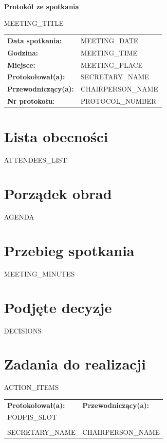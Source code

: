 \documentclass[a4paper,11pt]{article}
\begin{document}
\begin{center}
{\Large\bfseries Protokół ze spotkania}

\vskip 0.3cm
{\large {{MEETING_TITLE}}}
\end{center}

\vskip 0.5cm

\noindent
\begin{tabular}{@{}ll}
\textbf{Data spotkania:} & {{MEETING_DATE}} \\
\textbf{Godzina:} & {{MEETING_TIME}} \\
\textbf{Miejsce:} & {{MEETING_PLACE}} \\
\textbf{Protokołował(a):} & {{SECRETARY_NAME}} \\
\textbf{Przewodniczący(a):} & {{CHAIRPERSON_NAME}} \\
\textbf{Nr protokołu:} & {{PROTOCOL_NUMBER}} \\
\end{tabular}

\vskip 0.8cm

\section*{Lista obecności}
{{ATTENDEES_LIST}}

\section*{Porządek obrad}
{{AGENDA}}

\section*{Przebieg spotkania}
{{MEETING_MINUTES}}

\section*{Podjęte decyzje}
{{DECISIONS}}

\section*{Zadania do realizacji}
{{ACTION_ITEMS}}

\vskip 1.5cm

\noindent
\begin{tabular}{p{7cm}p{7cm}}
\textbf{Protokołował(a):} & \textbf{Przewodniczący(a):} \\
{{PODPIS_SLOT}} & \\[-3mm]
\dotfill & \dotfill \\
{{SECRETARY_NAME}} & {{CHAIRPERSON_NAME}} \\
\end{tabular}
\end{document}
